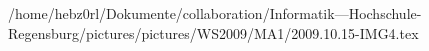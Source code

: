 /home/hebz0rl/Dokumente/collaboration/Informatik---Hochschule-Regensburg/pictures/pictures/WS2009/MA1/2009.10.15-IMG4.tex